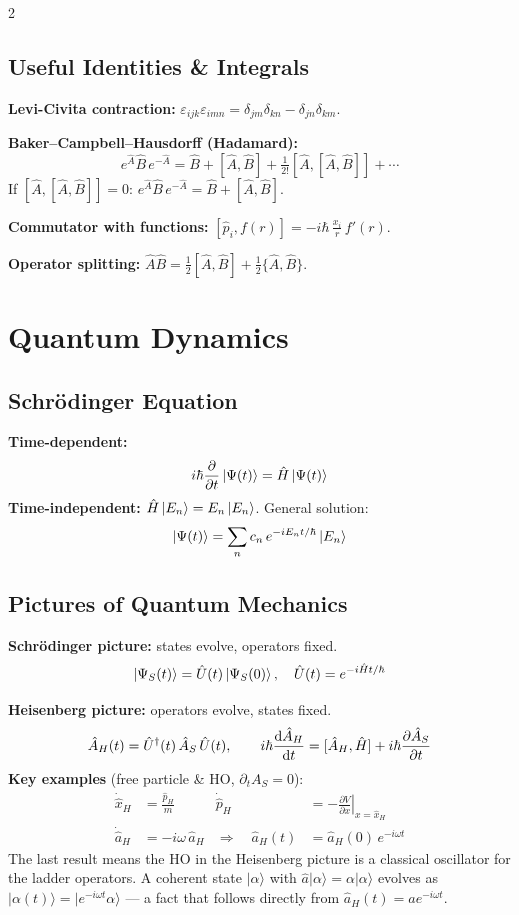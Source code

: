\documentclass[9pt,a4paper]{article} %
\newcommand{\Hhat}{\hat{H}}
\newcommand{\phat}{\hat{p}}
\newcommand{\xhat}{\hat{x}}
\newcommand{\aop}{\hat{a}}
\begin{document}
\begin{multicols}{2}
\subsection{Useful Identities \& Integrals}

\textbf{Levi-Civita contraction:}
$\varepsilon_{ijk}\varepsilon_{imn}=\delta_{jm}\delta_{kn}-\delta_{jn}\delta_{km}$.

\textbf{Baker--Campbell--Hausdorff (Hadamard):}
\[
e^{\hat{A}}\hat{B}\,e^{-\hat{A}}=\hat{B}+[\hat{A},\hat{B}]+\tfrac{1}{2!}[\hat{A},[\hat{A},\hat{B}]]+\cdots
\]
If $[\hat{A},[\hat{A},\hat{B}]]=0$: $e^{\hat{A}}\hat{B}\,e^{-\hat{A}}=\hat{B}+[\hat{A},\hat{B}]$.

\textbf{Commutator with functions:}
$[\hat{p}_i,f(r)]=-i\hbar\,\frac{x_i}{r}\,f'(r)$.

\textbf{Operator splitting:}
$\hat{A}\hat{B}=\tfrac{1}{2}[\hat{A},\hat{B}]+\tfrac{1}{2}\{\hat{A},\hat{B}\}$.

\section{Quantum Dynamics}

\subsection{Schr\"odinger Equation}
\textbf{Time-dependent:}
\[
i\hbar\pdv{}{t}\ket{\Psi(t)}=\Hhat\ket{\Psi(t)}
\]
\textbf{Time-independent:} $\Hhat\ket{E_n}=E_n\ket{E_n}$. General solution:
\[
\ket{\Psi(t)}=\sum_n c_n\,e^{-iE_n t/\hbar}\ket{E_n}
\]

\subsection{Pictures of Quantum Mechanics}
\textbf{Schr\"odinger picture:} states evolve, operators fixed.
\[
\ket{\Psi_S(t)}=\hat{U}(t)\ket{\Psi_S(0)}, \quad \hat{U}(t)=e^{-i\Hhat t/\hbar}
\]

\textbf{Heisenberg picture:} operators evolve, states fixed.
\[
\hat{A}_H(t)=\hat{U}^\dagger(t)\,\hat{A}_S\,\hat{U}(t), \qquad
i\hbar\dv{\hat{A}_H}{t}=[\hat{A}_H,\Hhat]+i\hbar\pdv{\hat{A}_S}{t}
\]
\textbf{Key examples} (free particle \& HO, $\partial_t A_S=0$):
\begin{align*}
  \dot{\xhat}_H &= \frac{\phat_H}{m}
  &\dot{\phat}_H &= -\left.\frac{\partial V}{\partial x}\right|_{x=\xhat_H}
\\
  \dot{\aop}_H &= -i\omega\,\aop_H
  &\Rightarrow\quad \aop_H(t) &= \aop_H(0)\,e^{-i\omega t}
\end{align*}
{\footnotesize The last result means the HO in the Heisenberg picture is a classical oscillator for the ladder operators. A coherent state $|\alpha\rangle$ with $\aop|\alpha\rangle=\alpha|\alpha\rangle$ evolves as $|\alpha(t)\rangle = |e^{-i\omega t}\alpha\rangle$ — a fact that follows directly from $\aop_H(t)=\aop e^{-i\omega t}$.}


\end{multicols}
\end{document}
